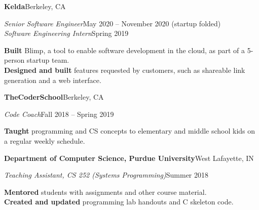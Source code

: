  \vspace{5pt}
  \textbf{Kelda}\quad{}\hfill Berkeley, CA
  \begin{adjustwidth}{10pt}{}
    \emph{Senior Software Engineer}\hfill May 2020 -- November 2020 (startup folded)\\
    \emph{Software Engineering Intern}\hfill Spring 2019

    \textbf{Built} Blimp, a tool to enable software development in the cloud, as part of a 5-person startup team.\\
    \textbf{Designed and built} features requested by customers, such as shareable link generation and a web interface.
  \end{adjustwidth}


  \vspace{5pt}
  \textbf{TheCoderSchool}\hfill Berkeley, CA
  \begin{adjustwidth}{10pt}{}
    \emph{Code Coach}\hfill Fall 2018 -- Spring 2019

    \textbf{Taught} programming and CS concepts to elementary and middle school kids on a regular weekly schedule.
  \end{adjustwidth}

  \vspace{5pt}
  \textbf{Department of Computer Science, Purdue University}\hfill West Lafayette, IN
  \begin{adjustwidth}{10pt}{}
    \emph{Teaching Assistant, CS 252 (Systems Programming)}\hfill Summer 2018

    \textbf{Mentored} students with assignments and other course material.\\
    \textbf{Created and updated} programming lab handouts and C skeleton code.
  \end{adjustwidth}


